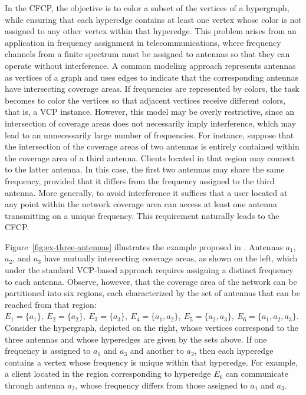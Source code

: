 \documentclass[preprint, 11pt, authoryear]{elsarticle}
\newcommand{\quitar}[1]{{\color{red} \sout{#1}}}
\begin{document}
In the CFCP, the objective is to color a subset of the vertices of a hypergraph, while ensuring that each hyperedge contains at least one vertex whose color is not assigned to any other vertex within that hyperedge.
This problem arises from an application in frequency assignment in telecommunications, where frequency channels from a finite spectrum must be assigned to antennas so that they can operate without interference. 
A common modeling approach represents antennas as vertices of a graph and uses edges to indicate that the corresponding antennas have intersecting coverage areas. 
If frequencies are represented by colors, the task becomes to color the vertices so that adjacent vertices receive different colors,
that is, a VCP instance.
However, this model may be overly restrictive, since an intersection of coverage areas does not necessarily imply interference, which may lead to an unnecessarily large number of frequencies.
For instance, suppose that the intersection of the coverage areas of two antennas is entirely contained within the coverage area of a third antenna. Clients located in that region may connect to the latter antenna. In this case, the first two antennas may share the same frequency, provided that it differs from the frequency assigned to the third antenna. More generally, to avoid interference it suffices that a user located at any point within the network coverage area can access at least one antenna transmitting on a unique frequency. This requirement naturally leads to the CFCP.


Figure~\ref{fig:ex-three-antennas} illustrates the example proposed in \cite{Smorodinsky13}. Antennas $a_1$, $a_2$, and $a_3$ have mutually intersecting coverage areas, as shown on the left, which under the standard VCP-based approach requires assigning a distinct frequency to each antenna. Observe, however, that the coverage area of the network can be partitioned into six regions, each characterized by the set of antennas that can be reached from that region:
$E_1 = \{a_1\},\ E_2 = \{a_2\},\ E_3 = \{a_3\},\ E_4 = \{a_1, a_2\},\ E_5 = \{a_2, a_3\},\ E_6 = \{a_1, a_2, a_3\}$.
Consider the hypergraph, depicted on the right, whose vertices correspond to the three antennas and whose hyperedges are given by the sets above. If one frequency is assigned to $a_1$ and $a_3$ and another to $a_2$, then each hyperedge contains a vertex whose frequency is unique within that hyperedge. For example, a client located in the region corresponding to hyperedge $E_6$ can communicate through antenna $a_2$, whose frequency differs from those assigned to $a_1$ and $a_3$.
\end{document}
